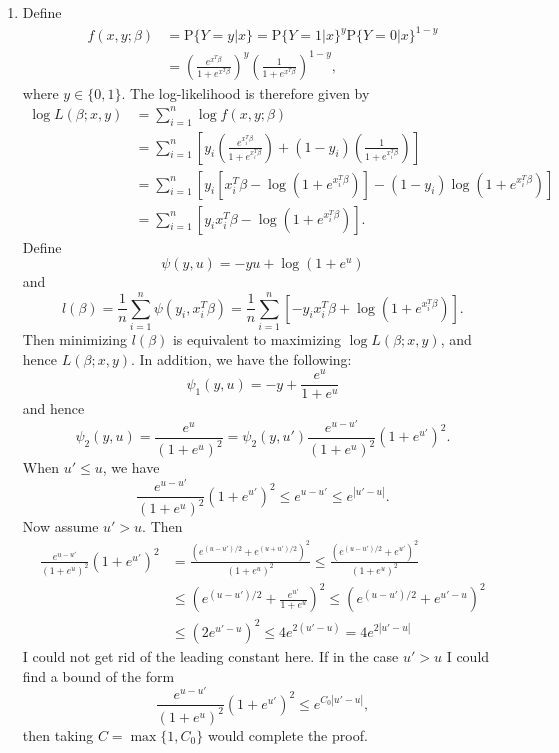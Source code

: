\documentclass[12pt]{article}
\newcommand{\Prob}{\mathrm{P}}
\begin{document}
\begin{enumerate}
\item
Define
\begin{align*}
f(x, y; \beta) &= \Prob\{Y = y | x\} = \Prob\{Y = 1 | x\}^y \Prob\{Y = 0 | x\}^{1-y} \\
&= \left(\frac{e^{x^T\beta}}{1 + e^{x^T\beta}}\right)^y \left(\frac{1}{1 + e^{x^T\beta}}\right)^{1-y},
\end{align*}
where $y \in \{0, 1\}$. The log-likelihood is therefore given by
\begin{align*}
\log L(\beta; x, y) &= \sum_{i=1}^n \log f(x, y; \beta) \\
&= \sum_{i=1}^n \left[y_i \left(\frac{e^{x_i^T\beta}}{1 + e^{x_i^T\beta}}\right) + (1-y_i) \left(\frac{1}{1 + e^{x_i^T\beta}}\right) \right] \\
&= \sum_{i=1}^n \left[y_i\left[x_i^T\beta - \log(1 + e^{x_i^T\beta})\right] - (1 - y_i)\log(1 + e^{x_i^T\beta})\right] \\
&= \sum_{i=1}^n \left[y_i x_i^T\beta - \log(1 + e^{x_i^T\beta})\right].
\end{align*}
Define
\begin{equation*}
\psi(y, u) = -yu + \log(1 + e^u)
\end{equation*}
and
\begin{equation*}
l(\beta) = \frac{1}{n} \sum_{i=1}^n \psi(y_i, x_i^T\beta) = \frac{1}{n} \sum_{i=1}^n [-y_ix_i^T\beta + \log(1 + e^{x_i^T\beta})].
\end{equation*}
Then minimizing $l(\beta)$ is equivalent to maximizing $\log L(\beta; x, y)$, and hence $L(\beta; x, y)$. In addition, we have the following:
\begin{equation*}
\psi_1(y, u) = -y + \frac{e^u}{1 + e^u}
\end{equation*}
and hence
\begin{equation*}
\psi_2(y, u) = \frac{e^u}{(1 + e^u)^2} = \psi_2(y, u') \frac{e^{u - u'}}{(1 + e^u)^2}(1 + e^{u'})^2.
\end{equation*}
When $u' \leq u$, we have
\begin{equation*}
\frac{e^{u - u'}}{(1 + e^u)^2}(1 + e^{u'})^2 \leq e^{u - u'} \leq e^{|u' - u|}.
\end{equation*}
Now assume $u' > u$. Then
\begin{align*}
\frac{e^{u - u'}}{(1 + e^u)^2}(1 + e^{u'})^2 &= \frac{(e^{(u-u')/2} + e^{(u+u')/2})^2}{(1+e^u)^2}\leq \frac{(e^{(u-u')/2} + e^{u'})^2}{(1+e^u)^2} \\
&\leq \left(e^{(u-u')/2} + \frac{e^{u'}}{1+e^u}\right)^2 \leq \left(e^{(u-u')/2} + e^{u' - u}\right)^2 \\
&\leq (2e^{u' - u})^2 \leq 4e^{2(u' - u)} = 4e^{2|u' - u|}
\end{align*}
I could not get rid of the leading constant here. If in the case $u' > u$ I could find a bound of the form
\begin{equation*}
\frac{e^{u - u'}}{(1 + e^u)^2}(1 + e^{u'})^2 \leq e^{C_0|u' - u|},
\end{equation*}
then taking $C = \max\{1, C_0\}$ would complete the proof.


\end{enumerate}
\end{document}
